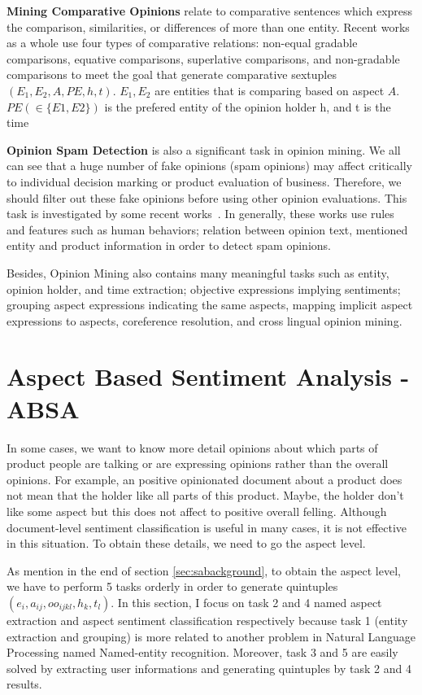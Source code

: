 \documentclass{article}
\begin{document}
\textbf{Mining Comparative Opinions} relate to comparative sentences which express the comparison, similarities, or differences of more than one entity.
		Recent works~\cite{xx} as a whole use four types of comparative relations: non-equal gradable comparisons, equative comparisons, superlative comparisons, and non-gradable comparisons to meet the goal that generate comparative sextuples $(E_1, E_2, A, PE, h, t)$.
		$E_1,E_2$ are entities that is comparing based on aspect $A$.
		$PE (\in \{E1, E2\})$ is the prefered entity of the opinion holder h, and t is the time
		
\textbf{Opinion Spam Detection} is also a significant task in opinion mining.
		We all can see that a huge number of fake opinions (spam opinions) may affect critically to individual decision marking or product evaluation of business.
		Therefore, we should filter out these fake opinions before using other opinion evaluations.
		This task is investigated by some recent works~\cite{xx}.
		In generally, these works use rules and features such as human behaviors; relation between opinion text, mentioned entity and product information in order to detect spam opinions.
		
Besides, Opinion Mining also contains many meaningful tasks such as entity, opinion holder, and time extraction; objective expressions implying sentiments; grouping aspect expressions indicating the same aspects, mapping implicit aspect expressions to aspects, coreference resolution, and cross lingual opinion mining.

\section{Aspect Based Sentiment Analysis - ABSA}
\label{sec:sbsa}

In some cases, we want to know more detail opinions about which parts of product people are talking or are expressing opinions rather than the overall opinions.
For example, an positive opinionated document about a product does not mean that the holder like all parts of this product.
Maybe, the holder don't like some aspect	 but this does not affect to positive overall felling.
Although document-level sentiment classification is useful in many cases, it is not effective in this situation. 
To obtain these details, we need to go the aspect level.


As mention in the end of section \ref{sec:sabackground}, to obtain the aspect level, we have to perform 5 tasks orderly in order to generate quintuples $(e_i, a_{ij}, oo_{ijkl}, h_k, t_l)$.
In this section, I focus on task 2 and 4 named aspect extraction and aspect sentiment classification respectively because task 1 (entity extraction and grouping) is more related to another problem in Natural Language Processing named Named-entity recognition.
Moreover, task 3 and 5 are easily solved by extracting user informations and generating quintuples by task 2 and 4 results.
\end{document}
